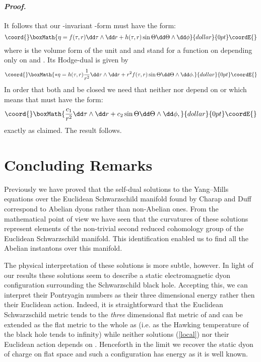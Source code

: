 \documentclass[a4paper,12pt,draft]{article}
\newenvironment{proof}{\paragraph{\it Proof.}}{\myHighlight{$\square$}\coordHE{}\vskip0.4cm}
\begin{document}
\begin{proof}
It follows that our \coordHE{}-invariant \coordHE{}-form must have the form:
$$\coord{}\boxMath{\eta=f(\tau ,r)\dd\tau\wedge \dd r + h(\tau
,r)\sin\Theta\dd\Theta\wedge\dd\phi}{dollar}{0pt}\coordE{}$$ where 
\myHighlight{$-\sin\Theta\dd\Theta\wedge \dd\phi$}\coordHE{} is the volume form  of the
unit \coordHE{} and \coordHE{} and \coordHE{} stand for a 
function on \coordHE{} depending  only on \myHighlight{$\tau$}\coordHE{} and \coordHE{}. Its Hodge-dual is
given by $$\coord{}\boxMath{*\eta = h(\tau ,r)\frac{1}{r^2}\dd\tau\wedge\dd r
+r^2f(\tau , r)\sin\Theta\dd\Theta\wedge\dd\phi .}{dollar}{0pt}\coordE{}$$
In order that both \myHighlight{$\eta$}\coordHE{} and \myHighlight{$*\eta$}\coordHE{} be closed we need that neither 
\coordHE{} nor \coordHE{} depend on \myHighlight{$\tau$}\coordHE{} or \coordHE{} which means
that \myHighlight{$\eta$}\coordHE{} must have the form: 
$$\coord{}\boxMath{\frac{c_1}{r^2}\dd\tau\wedge\dd r+ c_2\sin\Theta\dd\Theta\wedge\dd\phi
,}{dollar}{0pt}\coordE{}$$ exactly as claimed. The result follows. 
\end{proof}


\section{Concluding Remarks}



Previously we have proved that the self-dual solutions to the \coordHE{}
Yang--Mills equations over the Euclidean Schwarzschild manifold found by
Charap and Duff correspond to Abelian dyons rather than non-Abelian ones.
From the mathematical point of view we have seen that the curvatures of
these solutions represent elements of the non-trivial second reduced \coordHE{}
cohomology group of the Euclidean Schwarzschild manifold. This
identification enabled us to find all the Abelian instantons over this
manifold.

The physical interpretation of these solutions is more subtle, however. In
light of our results these solutions seem to describe a static  
electromagnetic dyon configuration surrounding the Schwarzschild black
hole. Accepting this, we can interpret their Pontryagin numbers \coordHE{} as
their three dimensional energy rather then their Euclidean action. Indeed,
it is straightforward that the Euclidean Schwarzschild metric tends to the
{\it three} dimensional flat metric of \coordHE{} and can be
extended as the flat metric to the whole \coordHE{} as \coordHE{}
(i.e. as the Hawking temperature of the black hole tends to infinity)
while neither solutions (\ref{local}) nor their Euclidean action 
depends on \coordHE{}. Henceforth in the limit \coordHE{} we recover the
static dyon of charge \coordHE{} on flat space and such a configuration has
energy \coordHE{} as it is well known. 
\end{document}
